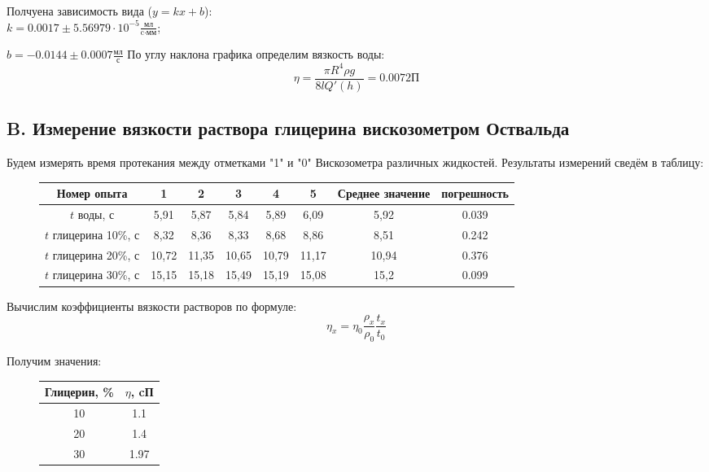 \documentclass{article}
\begin{document}
\begin{enumerate}
Полчуена зависимость вида ($y = kx + b$):\\
$k = 0.0017 \pm 5.56979\cdot10^{-5} \frac{\text{мл}}{\text{c}\cdot \text{мм}}$;

$b = -0.0144 \pm 0.0007 \frac{\text{мл}}{\text{с}}$
По углу наклона графика определим вязкость воды:
\[ \eta = \frac{\pi R^4\rho g}{8lQ'(h)} = 0.0072 \text{П} \]

\end{enumerate}
\subsection{B. Измерение вязкости раствора глицерина вискозометром Оствальда}

Будем измерять время протекания между отметками "1" и "0" Вискозометра различных жидкостей. 
Результаты измерений сведём в таблицу:

\begin{figure}[H]
    \centering
    \begin{tabular}{|c|c|c|c|c|c|c|c|}
    \hline
        Номер опыта&1&2&3&4&5&Среднее значение&погрешность\\ \hline
        $t$ воды, с& 5,91 & 5,87 & 5,84 & 5,89 & 6,09 & 5,92 & 0.039\\ \hline
        $t$ глицерина 10\%, с& 8,32 & 8,36 & 8,33 & 8,68 & 8,86 & 8,51 & 0.242\\ \hline
        $t$ глицерина 20\%, с& 10,72 & 11,35 & 10,65 & 10,79 & 11,17 & 10,94 & 0.376\\ \hline
        $t$ глицерина 30\%, с& 15,15 & 15,18 & 15,49 & 15,19 & 15,08 & 15,2 & 0.099\\ \hline
    \end{tabular}
\end{figure}

Вычислим коэффициенты вязкости растворов по формуле:
\[ \eta_x = \eta_0\frac{\rho_x}{\rho_0}\frac{t_x}{t_0}\]

Получим значения:

\begin{figure}[H]
    \centering
    \begin{tabular}{|c|c|}
        \hline
        Глицерин, \%&$\eta$, cП\\ \hline
        10&1.1\\ \hline
        20&1.4\\ \hline
        30&1.97\\ \hline 
    \end{tabular}
\end{figure}
\end{document}
